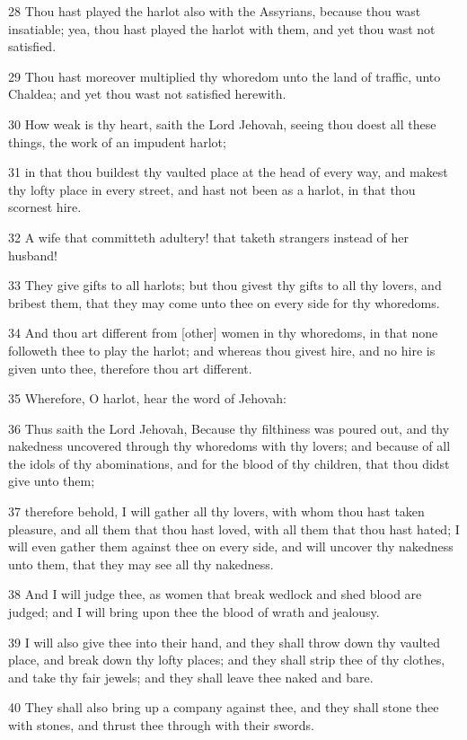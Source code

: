 \par 28 Thou hast played the harlot also with the Assyrians, because thou wast insatiable; yea, thou hast played the harlot with them, and yet thou wast not satisfied.
\par 29 Thou hast moreover multiplied thy whoredom unto the land of traffic, unto Chaldea; and yet thou wast not satisfied herewith.
\par 30 How weak is thy heart, saith the Lord Jehovah, seeing thou doest all these things, the work of an impudent harlot;
\par 31 in that thou buildest thy vaulted place at the head of every way, and makest thy lofty place in every street, and hast not been as a harlot, in that thou scornest hire.
\par 32 A wife that committeth adultery! that taketh strangers instead of her husband!
\par 33 They give gifts to all harlots; but thou givest thy gifts to all thy lovers, and bribest them, that they may come unto thee on every side for thy whoredoms.
\par 34 And thou art different from [other] women in thy whoredoms, in that none followeth thee to play the harlot; and whereas thou givest hire, and no hire is given unto thee, therefore thou art different.
\par 35 Wherefore, O harlot, hear the word of Jehovah:
\par 36 Thus saith the Lord Jehovah, Because thy filthiness was poured out, and thy nakedness uncovered through thy whoredoms with thy lovers; and because of all the idols of thy abominations, and for the blood of thy children, that thou didst give unto them;
\par 37 therefore behold, I will gather all thy lovers, with whom thou hast taken pleasure, and all them that thou hast loved, with all them that thou hast hated; I will even gather them against thee on every side, and will uncover thy nakedness unto them, that they may see all thy nakedness.
\par 38 And I will judge thee, as women that break wedlock and shed blood are judged; and I will bring upon thee the blood of wrath and jealousy.
\par 39 I will also give thee into their hand, and they shall throw down thy vaulted place, and break down thy lofty places; and they shall strip thee of thy clothes, and take thy fair jewels; and they shall leave thee naked and bare.
\par 40 They shall also bring up a company against thee, and they shall stone thee with stones, and thrust thee through with their swords.

